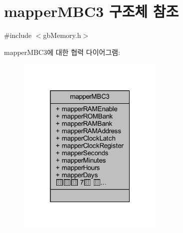 \hypertarget{structmapper_m_b_c3}{}\section{mapper\+M\+B\+C3 구조체 참조}
\label{structmapper_m_b_c3}


{\ttfamily \#include $<$gb\+Memory.\+h$>$}



mapper\+M\+B\+C3에 대한 협력 다이어그램\+:\nopagebreak
\begin{figure}[H]
\begin{center}
\leavevmode
\includegraphics[width=199pt]{structmapper_m_b_c3__coll__graph}
\end{center}
\end{figure}
